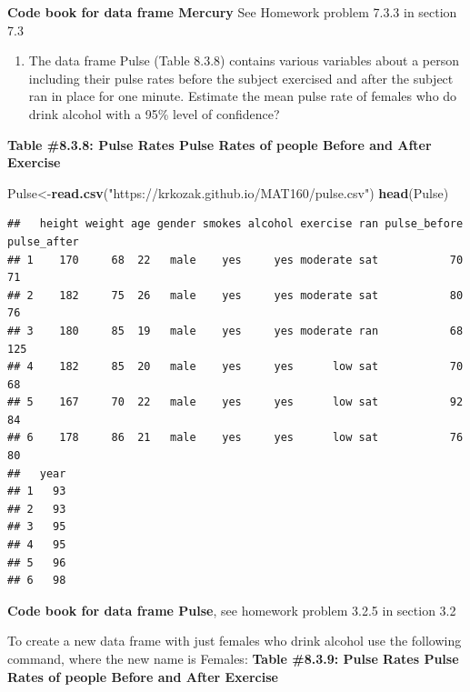 \documentclass[
]{book}
\newenvironment{Shaded}{\begin{snugshade}}{\end{snugshade}}
\newcommand{\KeywordTok}[1]{\textcolor[rgb]{0.13,0.29,0.53}{\textbf{#1}}}
\newcommand{\NormalTok}[1]{#1}
\newcommand{\OperatorTok}[1]{\textcolor[rgb]{0.81,0.36,0.00}{\textbf{#1}}}
\newcommand{\StringTok}[1]{\textcolor[rgb]{0.31,0.60,0.02}{#1}}
\providecommand{\tightlist}{%
  \setlength{\itemsep}{0pt}\setlength{\parskip}{0pt}}
\begin{document}
\textbf{Code book for data frame Mercury} See Homework problem 7.3.3 in section 7.3

\begin{enumerate}
\def\labelenumi{\arabic{enumi}.}
\setcounter{enumi}{3}
\tightlist
\item
  The data frame Pulse (Table 8.3.8) contains various variables about a person including their pulse rates before the subject exercised and after the subject ran in place for one minute. Estimate the mean pulse rate of females who do drink alcohol with a 95\% level of confidence?
\end{enumerate}

\textbf{Table \#8.3.8: Pulse Rates Pulse Rates of people Before and After Exercise}

\begin{Shaded}
\begin{Highlighting}[]
\NormalTok{Pulse<-}\KeywordTok{read.csv}\NormalTok{(}\StringTok{"https://krkozak.github.io/MAT160/pulse.csv"}\NormalTok{)}
\KeywordTok{head}\NormalTok{(Pulse)}
\end{Highlighting}
\end{Shaded}

\begin{verbatim}
##   height weight age gender smokes alcohol exercise ran pulse_before pulse_after
## 1    170     68  22   male    yes     yes moderate sat           70          71
## 2    182     75  26   male    yes     yes moderate sat           80          76
## 3    180     85  19   male    yes     yes moderate ran           68         125
## 4    182     85  20   male    yes     yes      low sat           70          68
## 5    167     70  22   male    yes     yes      low sat           92          84
## 6    178     86  21   male    yes     yes      low sat           76          80
##   year
## 1   93
## 2   93
## 3   95
## 4   95
## 5   96
## 6   98
\end{verbatim}

\textbf{Code book for data frame Pulse}, see homework problem 3.2.5 in section 3.2

To create a new data frame with just females who drink alcohol use the following command, where the new name is Females:
\textbf{Table \#8.3.9: Pulse Rates Pulse Rates of people Before and After Exercise}

\begin{Shaded}
\end{Shaded}
\end{document}
